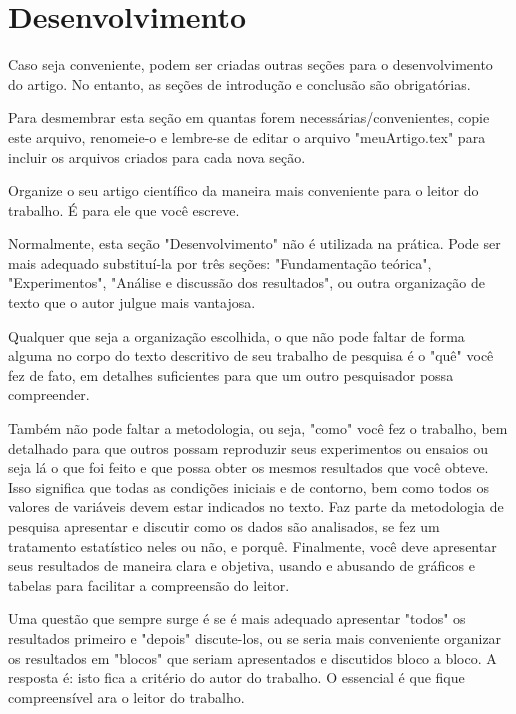 

\section{Desenvolvimento}\label{sec:desenvolvimento}	%


Caso seja conveniente, podem ser criadas outras seções para o desenvolvimento do artigo. No entanto, as seções de introdução e conclusão são obrigatórias.

Para desmembrar esta seção em quantas forem necessárias/convenientes, copie este arquivo, renomeie-o e lembre-se de editar o arquivo "meuArtigo.tex" para incluir os arquivos criados para cada nova seção.

Organize o seu artigo científico da maneira mais conveniente para o leitor do trabalho. É para ele que você escreve.

Normalmente, esta seção "Desenvolvimento" não é utilizada na prática. Pode ser mais adequado substituí-la por três seções: "Fundamentação teórica", "Experimentos", "Análise e discussão dos resultados", ou outra organização de texto que o autor julgue mais vantajosa.

Qualquer que seja a organização escolhida, o que não pode faltar de forma alguma no corpo do texto descritivo de seu trabalho de pesquisa é o "quê" você fez de fato, em detalhes suficientes para que um outro pesquisador possa compreender.

Também não pode faltar a metodologia, ou seja, "como" você fez o trabalho, bem detalhado para que outros possam reproduzir seus experimentos ou ensaios ou seja lá o que foi feito e que possa obter os mesmos resultados que você obteve. Isso significa que todas as condições iniciais e de contorno, bem como todos os valores de variáveis devem estar indicados no texto. Faz parte da metodologia de pesquisa apresentar e discutir como os dados são analisados, se fez um tratamento estatístico neles ou não, e porquê. Finalmente, você deve apresentar seus resultados de maneira clara e objetiva, usando e abusando de gráficos e tabelas para facilitar a compreensão do leitor.

Uma questão que sempre surge é se é mais adequado apresentar "todos" os resultados primeiro e "depois" discute-los, ou se seria mais conveniente organizar os resultados em "blocos" que seriam apresentados e discutidos  bloco a bloco. A resposta é: isto fica a critério do autor do trabalho. O essencial é que fique compreensível ara o leitor do trabalho.

